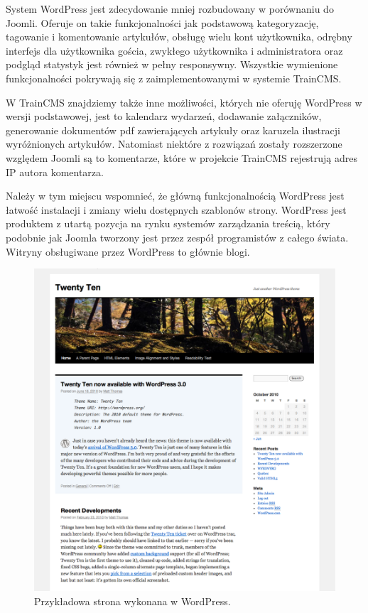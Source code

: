 \documentclass[openright]{xmgr}
\begin{document}
System WordPress jest zdecydowanie mniej rozbudowany w porównaniu do Joomli. Oferuje on takie funkcjonalności jak podstawową kategoryzację, tagowanie i komentowanie artykułów, obsługę wielu kont użytkownika, odrębny interfejs dla użytkownika gościa, zwykłego użytkownika i administratora oraz podgląd statystyk jest również w pełny responsywny. Wszystkie wymienione funkcjonalności pokrywają się z zaimplementowanymi w systemie TrainCMS.

W TrainCMS znajdziemy także inne możliwości, których nie oferuję WordPress w wersji podstawowej, jest to kalendarz wydarzeń, dodawanie załączników, generowanie dokumentów pdf zawierających artykuły oraz karuzela ilustracji wyróżnionych artykułów. Natomiast niektóre z rozwiązań zostały rozszerzone względem Joomli są to komentarze, które w projekcie TrainCMS rejestrują adres IP autora komentarza. 

Należy w tym miejscu wspomnieć, że główną funkcjonalnością WordPress jest łatwość instalacji i zmiany wielu dostępnych szablonów strony. WordPress jest produktem z utartą pozycja na rynku systemów zarządzania treścią, który podobnie jak Joomla tworzony jest przez zespół programistów z całego świata. Witryny obsługiwane przez WordPress to głównie blogi.

\newpage

\begin{figure}[!tbh]
\centering
\includegraphics[width=\linewidth]{fig/wordpress}
\caption{Przykładowa strona wykonana w WordPress.}
\end{figure}
\end{document}
